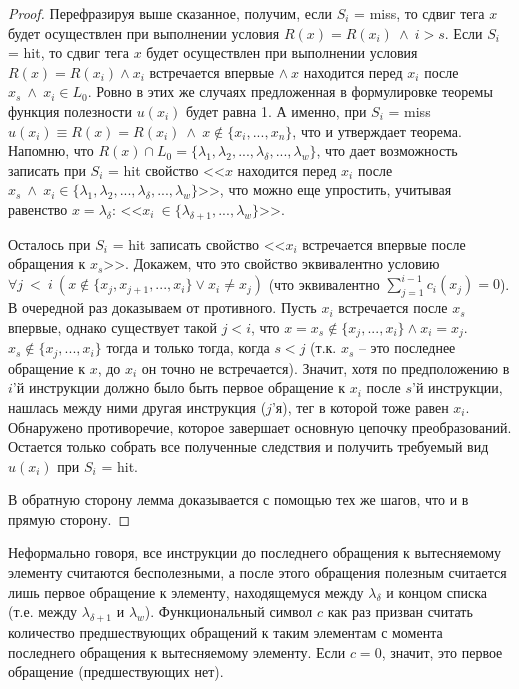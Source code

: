 \begin{proof}
  Перефразируя выше сказанное, получим, если $S_i$ = miss, то сдвиг
  тега $x$ будет осуществлен при выполнении условия $R(x) =
  R(x_i)~\wedge~i > s$. Если $S_i$ = hit, то сдвиг тега $x$ будет
  осуществлен при выполнении условия $R(x) = R(x_i) \wedge x_i$
  встречается впервые $\wedge~x$ находится перед $x_i$ после
  $x_s~\wedge~x_i \in L_0$. Ровно в этих же случаях предложенная в
  формулировке теоремы функция полезности $u(x_i)$ будет равна 1. А
  именно, при $S_i$ = miss $u(x_i) \equiv R(x) = R(x_i)~\wedge~x
  \notin \{x_i, ..., x_n\}$, что и утверждает теорема. Напомню, что
  $R(x) \cap L_0 = \{\lambda_1, \lambda_2, ..., \lambda_\delta, ...,
  \lambda_w\}$, что дает возможность записать при $S_i$ = hit
  свойство <<$x$ находится перед $x_i$ после $x_s~\wedge~x_i \in
  \{\lambda_1, \lambda_2, ..., \lambda_\delta, ..., \lambda_w\}$>>,
  что можно еще упростить, учитывая равенство $x = \lambda_\delta$:
  <<$x_i~\in \{\lambda_{\delta+1}, ..., \lambda_w\}$>>.

  Осталось при $S_i$ = hit записать свойство <<$x_i$ встречается
  впервые после обращения к $x_s$>>. Докажем, что это свойство
  эквивалентно условию $\forall j~<~i~(x\notin\{x_j, x_{j+1},
  ..., x_i\} \vee x_i \neq x_j)$ (что эквивалентно $\sum_{j=1}^{i-1}
  c_i(x_j) = 0$). В очередной раз доказываем от противного. Пусть
  $x_i$ встречается после $x_s$ впервые, однако существует такой $j
  < i$, что $x = x_s \notin \{x_j, ..., x_i\} \wedge x_i = x_j$.
  $x_s \notin \{x_j, ..., x_i\}$ тогда и только тогда,
  когда $s < j$ (т.к. $x_s$ -- это последнее обращение к $x$, до
  $x_i$ он точно не встречается). Значит, хотя по предположению в
  $i$'й инструкции должно было быть первое обращение к $x_i$ после
  $s$'й инструкции, нашлась между ними другая инструкция ($j$'я),
  тег в которой тоже равен $x_i$. Обнаружено противоречие, которое
  завершает основную цепочку преобразований. Остается только собрать
  все полученные следствия и получить требуемый вид $u(x_i)$ при
  $S_i$ = hit.

  В обратную сторону лемма доказывается с помощью тех же шагов, что
  и в прямую сторону.
\end{proof}

Неформально говоря, все инструкции до последнего обращения к
вытесняемому элементу считаются бесполезными, а после этого
обращения полезным считается лишь первое обращение к элементу,
находящемуся между $\lambda_\delta$ и концом списка (т.е. между
$\lambda_{\delta+1}$ и $\lambda_w$). Функциональный символ $c$ как
раз призван считать количество предшествующих обращений к таким
элементам с момента последнего обращения к вытесняемому элементу.
Если $c = 0$, значит, это первое обращение (предшествующих нет).


